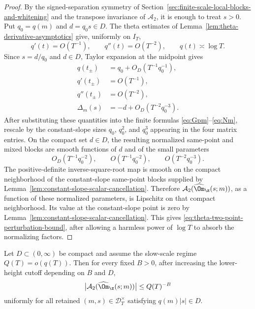 \begin{proof}
By the signed-separation symmetry of Section~\ref{sec:finite-scale-local-blocks-and-whitening}
and the transpose invariance of \(\mathcal A_2\), it is enough to treat
\(s>0\).  Put \(q_0=q(m)\) and \(d=q_0s\in D\).  The theta estimates of
Lemma~\ref{lem:theta-derivative-asymptotics} give, uniformly on
\(I_T\),
\[
        q'(t)=O(T^{-1}),\qquad q''(t)=O(T^{-2}),\qquad q(t)\asymp\log T.
\]
Since \(s=d/q_0\) and \(d\in D\), Taylor expansion at the midpoint gives
\begin{align*}
q(t_\pm)&=q_0+O_D(T^{-1}q_0^{-1}),\\
q'(t_\pm)&=O(T^{-1}),\\
q''(t_\pm)&=O(T^{-2}),\\
\Delta_m(s)&=-d+O_D(T^{-2}q_0^{-3}).
\end{align*}
After substituting these quantities into the finite formulas
\eqref{eq:Gpm}--\eqref{eq:Nm}, rescale by the constant-slope sizes
\(q_0\), \(q_0^2\), and \(q_0^3\) appearing in the four matrix entries.
On the compact set \(d\in D\), the resulting normalized same-point and mixed
blocks are smooth functions of \(d\) and of the small parameters
\[
        O_D(T^{-1}q_0^{-2}),\qquad O(T^{-1}q_0^{-2}),
        \qquad O(T^{-2}q_0^{-3}).
\]
The positive-definite inverse-square-root map is smooth on the compact
neighborhood of the constant-slope same-point blocks supplied by
Lemma~\ref{lem:constant-slope-scalar-cancellation}.  Therefore
\(\mathcal A_2(\widehat\Om_\z(s;m))\), as a function of these normalized
parameters, is Lipschitz on that compact neighborhood.  Its value at the
constant-slope point is zero by
Lemma~\ref{lem:constant-slope-scalar-cancellation}.  This gives
\eqref{eq:theta-two-point-perturbation-bound}, after allowing a harmless
power of \(\log T\) to absorb the normalizing factors.
\end{proof}

\begin{theorem}
\label{thm:zeta-suppression-two-point-theta}
Let \(D\subset(0,\infty)\) be compact and assume the slow-scale regime
\(Q(T)=o(q(T))\).  Then for every fixed \(B>0\), after increasing the
lower-height cutoff depending on \(B\) and \(D\),
\begin{equation}
\label{eq:zeta-suppression-two-point-scalar}
        \bigl|\mathcal A_2(\widehat\Om_\z(s;m))\bigr|
        \le Q(T)^{-B}
\end{equation}
uniformly for all retained \((m,s)\in\mathcal D_T^\times\) satisfying
\(q(m)|s|\in D\).
\end{theorem}

